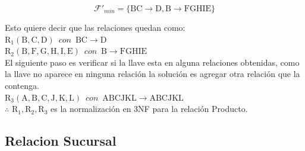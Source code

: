 \documentclass[10pt]{article}
\begin{document}
	$$\mathcal{F}'_{min}= \mathrm{\{ BC \rightarrow D, B \rightarrow FGHIE \}}$$
	
	Esto quiere decir que las relaciones quedan como: \\
	
	$\mathrm{R_1(B,C,D)}\,\,\, con \,\,\, \mathrm{ BC \rightarrow D}$\\
	$\mathrm{R_2(B,F, G, H, I, E)}\,\,\, con \,\,\, \mathrm{ B \rightarrow FGHIE}$\\
	
	El siguiente paso es verificar si la llave esta en alguna relaciones obtenidas, como la llave no aparece en ninguna relación la solución es agregar otra relación que la contenga.\\
	
	
	$\mathrm{R_3(A,B,C,J,K,L)}\,\,\, con \,\,\, \mathrm{ ABCJKL \rightarrow ABCJKL}$\\


   $\therefore \,\, \mathrm{R_1, R_2, R_3} $  es la normalización en 3NF para la relación Producto. 

   \subsection{Relacion Sucursal}
	
\end{document}
